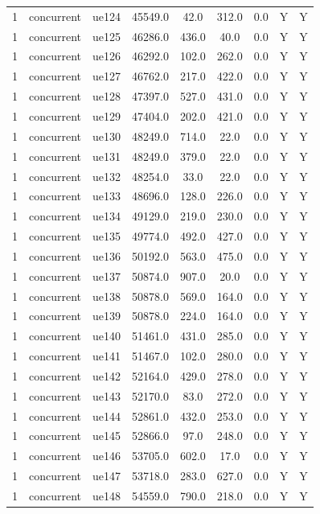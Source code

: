 \begin{table}[ht]
\begin{tabular}{|c|c|c|c|c|c|c|c|c|}
1 & concurrent & ue124 & 45549.0 & 42.0 & 312.0 & 0.0 & Y & Y \\
1 & concurrent & ue125 & 46286.0 & 436.0 & 40.0 & 0.0 & Y & Y \\
1 & concurrent & ue126 & 46292.0 & 102.0 & 262.0 & 0.0 & Y & Y \\
1 & concurrent & ue127 & 46762.0 & 217.0 & 422.0 & 0.0 & Y & Y \\
1 & concurrent & ue128 & 47397.0 & 527.0 & 431.0 & 0.0 & Y & Y \\
1 & concurrent & ue129 & 47404.0 & 202.0 & 421.0 & 0.0 & Y & Y \\
1 & concurrent & ue130 & 48249.0 & 714.0 & 22.0 & 0.0 & Y & Y \\
1 & concurrent & ue131 & 48249.0 & 379.0 & 22.0 & 0.0 & Y & Y \\
1 & concurrent & ue132 & 48254.0 & 33.0 & 22.0 & 0.0 & Y & Y \\
1 & concurrent & ue133 & 48696.0 & 128.0 & 226.0 & 0.0 & Y & Y \\
1 & concurrent & ue134 & 49129.0 & 219.0 & 230.0 & 0.0 & Y & Y \\
1 & concurrent & ue135 & 49774.0 & 492.0 & 427.0 & 0.0 & Y & Y \\
1 & concurrent & ue136 & 50192.0 & 563.0 & 475.0 & 0.0 & Y & Y \\
1 & concurrent & ue137 & 50874.0 & 907.0 & 20.0 & 0.0 & Y & Y \\
1 & concurrent & ue138 & 50878.0 & 569.0 & 164.0 & 0.0 & Y & Y \\
1 & concurrent & ue139 & 50878.0 & 224.0 & 164.0 & 0.0 & Y & Y \\
1 & concurrent & ue140 & 51461.0 & 431.0 & 285.0 & 0.0 & Y & Y \\
1 & concurrent & ue141 & 51467.0 & 102.0 & 280.0 & 0.0 & Y & Y \\
1 & concurrent & ue142 & 52164.0 & 429.0 & 278.0 & 0.0 & Y & Y \\
1 & concurrent & ue143 & 52170.0 & 83.0 & 272.0 & 0.0 & Y & Y \\
1 & concurrent & ue144 & 52861.0 & 432.0 & 253.0 & 0.0 & Y & Y \\
1 & concurrent & ue145 & 52866.0 & 97.0 & 248.0 & 0.0 & Y & Y \\
1 & concurrent & ue146 & 53705.0 & 602.0 & 17.0 & 0.0 & Y & Y \\
1 & concurrent & ue147 & 53718.0 & 283.0 & 627.0 & 0.0 & Y & Y \\
1 & concurrent & ue148 & 54559.0 & 790.0 & 218.0 & 0.0 & Y & Y \\

\end{tabular}
\end{table}
